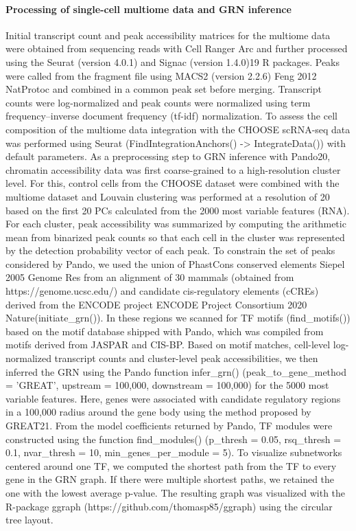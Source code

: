 \paragraph{Processing of single-cell multiome data and GRN inference}
Initial transcript count and peak accessibility matrices for the multiome data were obtained from sequencing reads with Cell Ranger Arc and further processed using the Seurat (version 4.0.1) and Signac (version 1.4.0)19 R packages. Peaks were called from the fragment file using MACS2 (version 2.2.6) {Feng 2012 NatProtoc} and combined in a common peak set before merging. Transcript counts were log-normalized and peak counts were normalized using term frequency–inverse document frequency (tf-idf) normalization. To assess the cell composition of the multiome data integration with the CHOOSE scRNA-seq data was performed using Seurat (FindIntegrationAnchors() -> IntegrateData()) with default parameters. As a preprocessing step to GRN inference with Pando20, chromatin accessibility data was first coarse-grained to a high-resolution cluster level. For this, control cells from the CHOOSE dataset were combined with the multiome dataset and Louvain clustering was performed at a resolution of 20 based on the first 20 PCs calculated from the 2000 most variable features (RNA). For each cluster, peak accessibility was summarized by computing the arithmetic mean from binarized peak counts so that each cell in the cluster was represented by the detection probability vector of each peak. To constrain the set of peaks considered by Pando, we used the union of PhastCons conserved elements {Siepel 2005 Genome Res} from an alignment of 30 mammals (obtained from https://genome.ucsc.edu/) and candidate cis-regulatory elements (cCREs) derived from the ENCODE project {ENCODE Project Consortium 2020 Nature}(initiate\_grn()). In these regions we scanned for TF motifs (find\_motifs()) based on the motif database shipped with Pando, which was compiled from motifs derived from JASPAR and CIS-BP. Based on motif matches, cell-level log-normalized transcript counts and cluster-level peak accessibilities, we then inferred the GRN using the Pando function infer\_grn() (peak\_to\_gene\_method = 'GREAT', upstream = 100,000, downstream = 100,000) for the 5000 most variable features. Here, genes were associated with candidate regulatory regions in a 100,000 radius around the gene body using the method proposed by GREAT21. From the model coefficients returned by Pando, TF modules were constructed using the function find\_modules() (p\_thresh = 0.05,  rsq\_thresh = 0.1, nvar\_thresh = 10, min\_genes\_per\_module = 5). To visualize subnetworks centered around one TF, we computed the shortest path from the TF to every gene in the GRN graph. If there were multiple shortest paths, we retained the one with the lowest average p-value. The resulting graph was visualized with the R-package ggraph (https://github.com/thomasp85/ggraph) using the circular tree layout.

